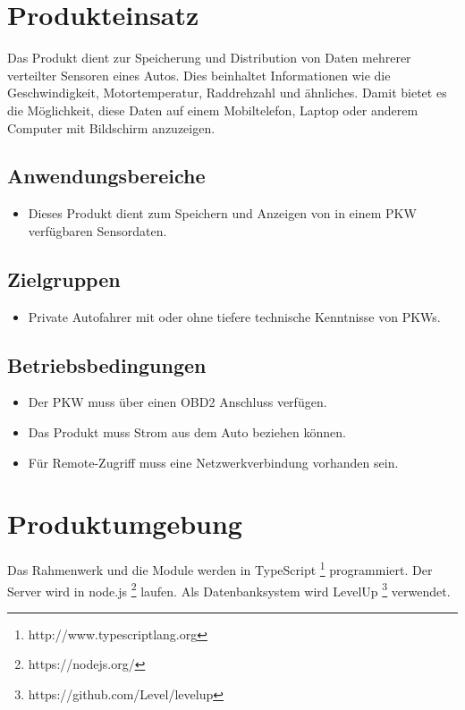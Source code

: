 \documentclass[pflichtenheft.tex]{subfiles}
\begin{document}
\chapter{Produkteinsatz}
Das Produkt dient zur Speicherung und Distribution von Daten mehrerer verteilter Sensoren eines Autos. Dies beinhaltet Informationen wie die Geschwindigkeit, Motortemperatur, Raddrehzahl und ähnliches. Damit bietet es die Möglichkeit, diese Daten  auf einem Mobiltelefon, Laptop oder anderem Computer mit Bildschirm anzuzeigen.


\section{Anwendungsbereiche}
\begin{itemize}
\item
Dieses Produkt dient zum Speichern und Anzeigen von in einem PKW verfügbaren Sensordaten.
\end{itemize}


\section{Zielgruppen}
\begin{itemize}
\item
Private Autofahrer mit oder ohne tiefere technische Kenntnisse von PKWs. 
\end{itemize}


\section{Betriebsbedingungen}
\begin{itemize}
\item
Der PKW muss über einen OBD2 Anschluss verfügen.
\item
Das Produkt muss Strom aus dem Auto beziehen können.
\item
Für Remote-Zugriff muss eine Netzwerkverbindung vorhanden sein.
\end{itemize}


\chapter{Produktumgebung}
Das Rahmenwerk und die Module werden in TypeScript \footnote{http://www.typescriptlang.org} programmiert. Der Server wird in node.js \footnote{https://nodejs.org/} laufen. Als Datenbanksystem wird LevelUp \footnote{https://github.com/Level/levelup} verwendet.
\end{document}
